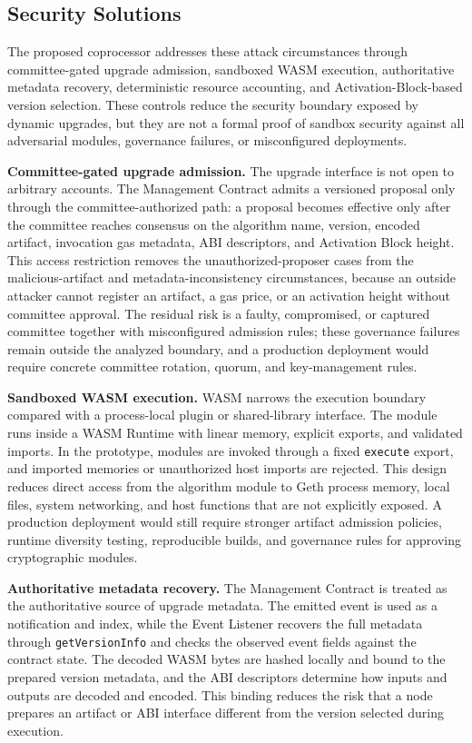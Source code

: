 \documentclass[pdflatex,sn-mathphys-num]{sn-jnl}%
\theoremstyle{thmstyleone}%
\theoremstyle{thmstyletwo}%
\theoremstyle{thmstylethree}%
\begin{document}
\subsection{Security Solutions}\label{sec4.2}
The proposed coprocessor addresses these attack circumstances through committee-gated upgrade admission, sandboxed WASM execution, authoritative metadata recovery, deterministic resource accounting, and Activation-Block-based version selection. These controls reduce the security boundary exposed by dynamic upgrades, but they are not a formal proof of sandbox security against all adversarial modules, governance failures, or misconfigured deployments.

\noindent\textbf{Committee-gated upgrade admission.}
The upgrade interface is not open to arbitrary accounts. The Management Contract admits a versioned proposal only through the committee-authorized path: a proposal becomes effective only after the committee reaches consensus on the algorithm name, version, encoded artifact, invocation gas metadata, ABI descriptors, and Activation Block height. This access restriction removes the unauthorized-proposer cases from the malicious-artifact and metadata-inconsistency circumstances, because an outside attacker cannot register an artifact, a gas price, or an activation height without committee approval. The residual risk is a faulty, compromised, or captured committee together with misconfigured admission rules; these governance failures remain outside the analyzed boundary, and a production deployment would require concrete committee rotation, quorum, and key-management rules.

\noindent\textbf{Sandboxed WASM execution.}
WASM narrows the execution boundary compared with a process-local plugin or shared-library interface. The module runs inside a WASM Runtime with linear memory, explicit exports, and validated imports. In the prototype, modules are invoked through a fixed \texttt{execute} export, and imported memories or unauthorized host imports are rejected. This design reduces direct access from the algorithm module to Geth process memory, local files, system networking, and host functions that are not explicitly exposed. A production deployment would still require stronger artifact admission policies, runtime diversity testing, reproducible builds, and governance rules for approving cryptographic modules.

\noindent\textbf{Authoritative metadata recovery.}
The Management Contract is treated as the authoritative source of upgrade metadata. The emitted event is used as a notification and index, while the Event Listener recovers the full metadata through \texttt{getVersionInfo} and checks the observed event fields against the contract state. The decoded WASM bytes are hashed locally and bound to the prepared version metadata, and the ABI descriptors determine how inputs and outputs are decoded and encoded. This binding reduces the risk that a node prepares an artifact or ABI interface different from the version selected during execution.
\end{document}
